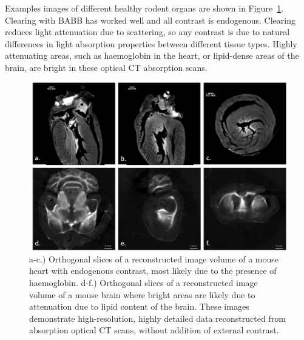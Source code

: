 Examples images of different healthy rodent organs are shown in Figure~\ref{fig:heart_brain}. Clearing with BABB has worked well and all contrast is endogenous. Clearing reduces light attenuation due to scattering, so any contrast is due to natural differences in light absorption properties between different tissue types. Highly attenuating areas, such as haemoglobin in the heart, or lipid-dense areas of the brain, are bright in these optical CT absorption scans.



	\begin{figure}[H]
		\centering
		\includegraphics[width = \textwidth]{meth_img/heart_brain_sclbr.png}
		\caption{a-c.) Orthogonal slices of a reconstructed image volume of a mouse heart with endogenous contrast, most likely due to the presence of haemoglobin. d-f.) Orthogonal slices of a reconstructed image volume of a mouse brain where bright areas are likely due to attenuation due to lipid content of the brain. These images demonstrate high-resolution, highly detailed data reconstructed from absorption optical CT scans,  without addition of external contrast.}
		\label{fig:heart_brain}
	\end{figure}
	
